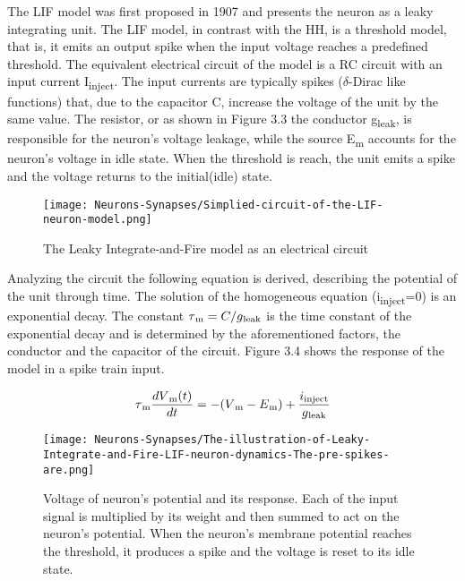 \documentclass[12pt]{report}
\begin{document}
The LIF model was first proposed in 1907 \cite{Brunel2007} and presents the neuron as a leaky integrating unit. The LIF model, in contrast with the HH, is a threshold model, that is, it emits an output spike when the input voltage reaches a predefined threshold. The equivalent electrical circuit of the model is a RC circuit with an input current I\textsubscript{inject}. The input currents are typically spikes (\(\delta\)-Dirac like functions) that, due to the capacitor C, increase the voltage of the unit by the same value. The resistor, or as shown in Figure 3.3 the conductor g\textsubscript{leak}, is responsible for the neuron's voltage leakage, while the source E\textsubscript{m} accounts for the neuron's voltage in idle state. When the threshold is reach, the unit emits a spike and the voltage returns to the initial(idle) state.

\begin{figure}[htp]
    \centering
    \texttt{[image: Neurons-Synapses/Simplied-circuit-of-the-LIF-neuron-model.png]}
    \caption{The Leaky Integrate-and-Fire model as an electrical circuit}
    \label{fig:lif-circuit}
\end{figure}

\vspace{5mm}

Analyzing the circuit the following equation is derived, describing the potential of the unit through time. The solution of the homogeneous equation (i\textsubscript{inject}=0) is an exponential decay. The constant \(\tau\textsubscript{m}=C/g\textsubscript{leak}\) is the time constant of the exponential decay and is determined by the aforementioned factors, the conductor and the capacitor of the circuit. Figure 3.4 shows the response of the model in a spike train input.

\vspace{5mm}

\begin{equation}
\tau\textsubscript{m}\frac{dV\textsubscript{m}(t)}{dt}=-(V\textsubscript{m}-E\textsubscript{m})+\frac{i\textsubscript{inject}}{g\textsubscript{leak}}
\end{equation}

\vspace{5mm}

\begin{figure}[htp]
    \centering
    \texttt{[image: Neurons-Synapses/The-illustration-of-Leaky-Integrate-and-Fire-LIF-neuron-dynamics-The-pre-spikes-are.png]}
    \caption{Voltage of neuron's potential and its response. Each of the input signal is multiplied by its weight and then summed to act on the neuron's potential. When the neuron's membrane potential reaches the threshold, it produces a spike and the voltage is reset to its idle state.}
    \label{fig:lif-neuron}
\end{figure}
\end{document}
